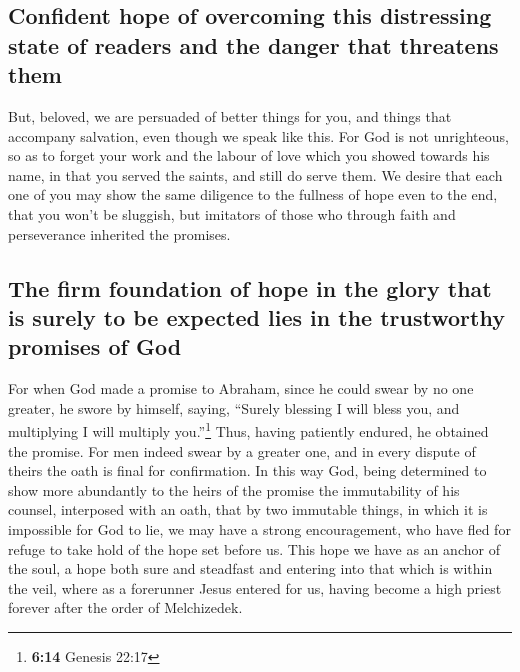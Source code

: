 \hypertarget{confident-hope-of-overcoming-this-distressing-state-of-readers-and-the-danger-that-threatens-them}{%
\subsection{Confident hope of overcoming this distressing state of
readers and the danger that threatens
them}\label{confident-hope-of-overcoming-this-distressing-state-of-readers-and-the-danger-that-threatens-them}}

 But, beloved, we are persuaded of better things for you,
and things that accompany salvation, even though we speak like this.
 For God is not unrighteous, so as to forget your work
and the labour of love which you showed towards his name, in that you
served the saints, and still do serve them.  We desire
that each one of you may show the same diligence to the fullness of hope
even to the end,  that you won't be sluggish, but
imitators of those who through faith and perseverance inherited the
promises.

\hypertarget{the-firm-foundation-of-hope-in-the-glory-that-is-surely-to-be-expected-lies-in-the-trustworthy-promises-of-god}{%
\subsection{The firm foundation of hope in the glory that is surely to
be expected lies in the trustworthy promises of
God}\label{the-firm-foundation-of-hope-in-the-glory-that-is-surely-to-be-expected-lies-in-the-trustworthy-promises-of-god}}

 For when God made a promise to Abraham, since he could
swear by no one greater, he swore by himself,  saying,
``Surely blessing I will bless you, and multiplying I will multiply
you.''\footnote{\textbf{6:14} Genesis 22:17}  Thus,
having patiently endured, he obtained the promise.  For
men indeed swear by a greater one, and in every dispute of theirs the
oath is final for confirmation.  In this way God, being
determined to show more abundantly to the heirs of the promise the
immutability of his counsel, interposed with an oath, 
that by two immutable things, in which it is impossible for God to lie,
we may have a strong encouragement, who have fled for refuge to take
hold of the hope set before us.  This hope we have as an
anchor of the soul, a hope both sure and steadfast and entering into
that which is within the veil,  where as a forerunner
Jesus entered for us, having become a high priest forever after the
order of Melchizedek.

